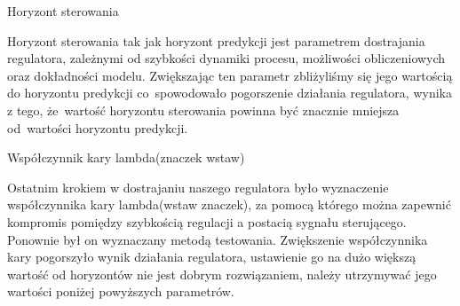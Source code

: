	Horyzont sterowania

Horyzont sterowania tak jak horyzont predykcji jest parametrem dostrajania regulatora, zależnymi od szybkości dynamiki procesu, możliwości obliczeniowych oraz dokładności modelu. Zwiększając ten parametr zbliżyliśmy się jego wartością do horyzontu predykcji co spowodowało pogorszenie działania regulatora, wynika z tego, że wartość horyzontu sterowania powinna być znacznie mniejsza od wartości horyzontu predykcji.

	Współczynnik kary lambda(znaczek wstaw)

Ostatnim krokiem w dostrajaniu naszego regulatora było wyznaczenie współczynnika kary lambda(wstaw znaczek), za pomocą którego można zapewnić kompromis pomiędzy szybkością regulacji a postacią sygnału sterującego. Ponownie był on wyznaczany metodą testowania. Zwiększenie współczynnika kary pogorszyło wynik działania regulatora, ustawienie go na dużo większą wartość od horyzontów nie jest dobrym rozwiązaniem, należy utrzymywać jego wartości poniżej powyższych parametrów.

